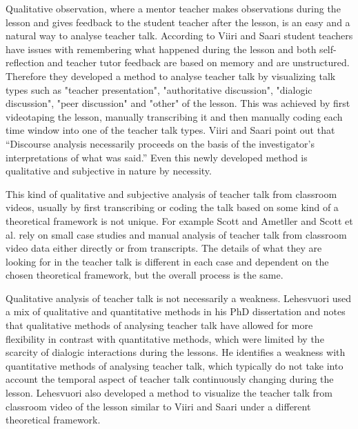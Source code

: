 \documentclass[utf8,english]{gradu3}
\begin{document}
Qualitative observation, where a mentor teacher makes observations during the lesson and gives feedback to the student teacher after the lesson, is an easy and a natural way to analyse teacher talk. According to Viiri and Saari \parencite*{viiriTeacherTalkPatterns2006} student teachers have issues with remembering what happened during the lesson and both self-reflection and teacher tutor feedback are based on memory and are unstructured. Therefore they developed a method to analyse teacher talk by visualizing talk types such as "teacher presentation", "authoritative discussion", "dialogic discussion", "peer discussion" and "other" of the lesson. This was achieved by first videotaping the lesson, manually transcribing it and then manually coding each time window into one of the teacher talk types. Viiri and Saari \parencite*{viiriTeacherTalkPatterns2006} point out that \enquote{Discourse analysis necessarily proceeds on the basis of the investigator’s interpretations of what was said.} Even this newly developed method is qualitative and subjective in nature by necessity.

This kind of qualitative and subjective analysis of teacher talk from classroom videos, usually by first transcribing or coding the talk based on some kind of a theoretical framework is not unique. For example Scott and Ametller \parencite*{scottTeachingScienceMeaningful2007} and Scott et al. \parencite*{scottPedagogicalLinkMaking2011} rely on small case studies and manual analysis of teacher talk from classroom video data either directly or from transcripts. The details of what they are looking for in the teacher talk is different in each case and dependent on the chosen theoretical framework, but the overall process is the same.

Qualitative analysis of teacher talk is not necessarily a weakness. Lehesvuori \parencite*{lehesvuoriDialogicTeachingScience2013} used a mix of qualitative and quantitative methods in his PhD dissertation and notes that qualitative methods of analysing teacher talk have allowed for more flexibility in contrast with quantitative methods, which were limited by the scarcity of dialogic interactions during the lessons. He identifies a weakness with quantitative methods of analysing teacher talk, which typically do not take into account the temporal aspect of teacher talk continuously changing during the lesson. Lehesvuori \parencite*{lehesvuoriVisualizingCommunicationStructures2013} also developed a method to visualize the teacher talk from classroom video of the lesson similar to Viiri and Saari \parencite*{viiriTeacherTalkPatterns2006} under a different theoretical framework.
\end{document}

